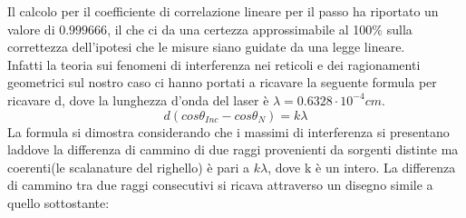 \documentclass{article}
\theoremstyle{definition}
\begin{document}
\begin{figure}[!htbp]
    	\captionsetup{labelformat=empty}
    \end{figure}
\noindent Il calcolo per il coefficiente di correlazione lineare per il passo ha riportato un valore di \(0.999666\), il che ci da una certezza approssimabile al 100\% sulla correttezza dell'ipotesi che le misure siano guidate da una legge lineare.\\

\noindent Infatti la teoria sui fenomeni di interferenza nei reticoli e dei ragionamenti geometrici sul nostro caso ci hanno portati a ricavare la seguente formula per ricavare d, dove la lunghezza d'onda del laser è $\lambda = 0.6328 \cdot 10^{-4}cm$.
\[d (cos\theta_{Inc} - cos\theta_{N}) = k \lambda\]
La formula si dimostra considerando che i massimi di interferenza si presentano laddove la differenza di cammino di due raggi provenienti da sorgenti distinte ma coerenti(le scalanature del righello) è pari a \(k\lambda\), dove k è un intero. La differenza di cammino tra due raggi consecutivi si ricava attraverso un disegno simile a quello sottostante:
\end{document}
